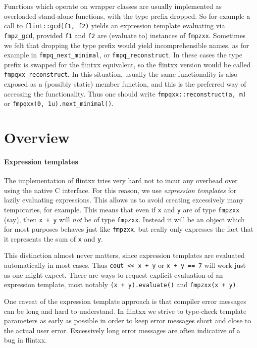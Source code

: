 \documentclass[a4paper,10pt]{book}
\newcommand{\code}{\lstinline}
\begin{document}
{{Functions which operate on wrapper classes are usually implemented as overloaded
stand-alone functions, with the type prefix dropped. So for example a call to
\code{flint::gcd(f1, f2)} yields an expression template evaluating via
\code{fmpz_gcd}, provided \code{f1} and \code{f2} are (evaluate to) instances of
\code{fmpzxx}. Sometimes we felt that dropping the type prefix would yield
incomprehensible names, as for example in \code{fmpq_next_minimal}, or
\code{fmpq_reconstruct}. In these cases the type prefix is swapped for the
flintxx equivalent, so the flintxx version would be called
\code{fmpqxx_reconstruct}. In this situation, usually the same functionality is
also exposed as a (possibly static) member function, and this is the preferred
way of accessing the functionality. Thus one should write
\code{fmpqxx::reconstruct(a, m)} or \code{fmpqxx(0, 1u).next_minimal()}.

\section{Overview}

\paragraph{Expression templates}
The implementation of flintxx tries very hard not to incur any overhead over
using the native C interface. For this reason, we use \emph{expression
templates} for lazily evaluating expressions. This allows us to avoid creating
excessively many temporaries, for example. This means that even if \code{x} and
\code{y} are of type \code{fmpzxx} (say), then \code{x + y} will \emph{not} be
of type \code{fmpzxx}. Instead it will be an object which for most purposes
behaves just like \code{fmpzxx}, but really only expresses the fact that it
represents the sum of \code{x} and \code{y}.

This distinction almost never matters, since expression templates are evaluated
automatically in most cases. Thus \code{cout << x + y} or \code{x + y == 7} will
work just as one might expect. There are ways to request explicit evaluation of
an expression template, most notably \code{(x + y).evaluate()} and
\code{fmpzxx(x + y)}.

One caveat of the expression template approach is that compiler error messages
can be long and hard to understand.
In flintxx we strive to type-check template parameters as early as possible in
order to keep error messages short and close to the actual user error.
Excessively long error messages are often indicative of a bug in flintxx.

}}
\end{document}
